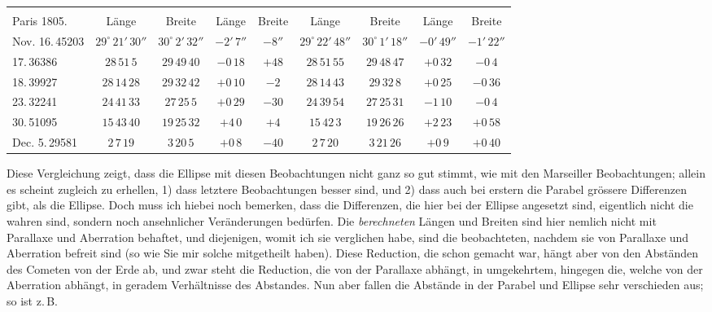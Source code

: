 \begin{center}\begingroup
\fontsize{8}{10}\selectfont
\setlength{\tabcolsep}{1pt}\renewcommand{\arraystretch}{1.12}
\begin{tabular}{l||c|c|c|c||c|c|c|c}
 &  &  &  &  \\
Paris 1805. & Länge & Breite & Länge & Breite & Länge & Breite & Länge & Breite \\
\hline
Nov. 16.\,45203 & $29^\circ\,21'\,30''$ & $30^\circ\,2'\,32''$ & $-2'\,7''$ & $-8''$ & $29^\circ\,22'\,48''$ & $30^\circ\,1'\,18''$ & $-0'\,49''$ & $-1'\,22''$ \\
17.\,36386 & $28\,51\,5$ & $29\,49\,40$ & $-0\,18$ & $+48$ & $28\,51\,55$ & $29\,48\,47$ & $+0\,32$ & $-0\,4$ \\
18.\,39927 & $28\,14\,28$ & $29\,32\,42$ & $+0\,10$ & $-2$ & $28\,14\,43$ & $29\,32\,8$ & $+0\,25$ & $-0\,36$ \\
23.\,32241 & $24\,41\,33$ & $27\,25\,5$ & $+0\,29$ & $-30$ & $24\,39\,54$ & $27\,25\,31$ & $-1\,10$ & $-0\,4$ \\
30.\,51095 & $15\,43\,40$ & $19\,25\,32$ & $+4\,0$ & $+4$ & $15\,42\,3$ & $19\,26\,26$ & $+2\,23$ & $+0\,58$ \\
Dec. 5.\,29581 & $2\,7\,19$ & $3\,20\,5$ & $+0\,8$ & $-40$ & $2\,7\,20$ & $3\,21\,26$ & $+0\,9$ & $+0\,40$ \\
\end{tabular}\endgroup\end{center}

\par\indent Diese Vergleichung zeigt, dass die Ellipse mit diesen Beobachtungen nicht ganz so gut stimmt, wie mit den Marseiller Beobachtungen; allein es scheint zugleich zu erhellen, 1) dass letztere Beobachtungen besser sind, und 2) dass auch bei erstern die Parabel grössere Differenzen gibt, als die Ellipse. Doch muss ich hiebei noch bemerken, dass die Differenzen, die hier bei der Ellipse angesetzt sind, eigentlich nicht die wahren sind, sondern noch ansehnlicher Veränderungen bedürfen. Die \emph{berechneten} Längen und Breiten sind hier nemlich nicht mit Parallaxe und Aberration behaftet, und diejenigen, womit ich sie verglichen habe, sind die beobachteten, nachdem sie von Parallaxe und Aberration befreit sind (so wie Sie mir solche mitgetheilt haben). Diese Reduction, die schon gemacht war, hängt aber von den Abständen des Cometen von der Erde ab, und zwar steht die Reduction, die von der Parallaxe abhängt, in umgekehrtem, hingegen die, welche von der Aberration abhängt, in geradem Verhältnisse des Abstandes. Nun aber fallen die Abstände in der Parabel und Ellipse sehr verschieden aus; so ist z.\,B.

